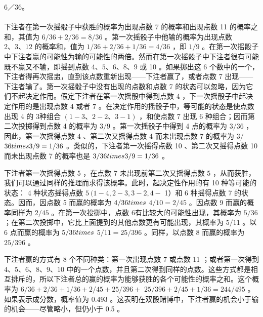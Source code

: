 6／36。\\\\下注者在第一次摇骰子中获胜的概率为出现点数 7 的概率和出现点数 11 的概率之和，其值为 $6 / 36+2 / 36=8 / 36$ 。第一次摇骰子中他输的概率为出现点数 $2 、 3 、 12$ 的概率和，值为 $1 / 36+2 / 36+1 / 36=4 / 36$ ，即 $1 / 9$ 。在第一次摇骰子中下注者赢的可能性为输的可能性的两倍。然而在第一次摇骰子中下注者很有可能既不赢又不输，即摇到点数 $4 、 5 、 6 、 8 、 9$ 或 10 。如果掷出这 6 个数中的一个，下注者得再次摇盅，直到该点数重新出现——下注者赢了，或者点数 7 出现——下注者输了。第一次摇骰子中没有出现的点数和点数 7 的状态可以忽略，因为它们不起决定作用。假定下注者在第一次摇骰中得到点数 4 ，下一次摇骰子中起决定作用的是出现点数 4 或者 7 。在决定作用的摇骰子中，等可能的状态是使点数出现 4 的 3种组合 $(1-3 、 2-2 、 3-1)$ ，和使点数 7 出现 6 种组合；因而第二次投掷得到点数 4 的概率为 $3 / 9$ 。第一次摇骰子中得到 4 点的概率为 $3 / 36$ ，因此，第一次摇得点数 4 、第二次又摇得点数 4 而未出现点数 7 的概率为 $3 /$ $36 \\times 3 / 9=1 / 36$ 。类似的，下注者第一次摇得点数 10 、第二次又摇得点数 10 而未出现点数 7 的概率也是 $3 / 36 \\times 3 / 9=1 / 36$ 。

下注者第一次摇得点数 5 ，在点数 7 未出现前第二次又摇得点数 5 ，从而获胜，我们可以通过同样的推理而求得该概率。此时，起决定性作用的有 10 种等可能的状态： 4 种状态摇得点数 $5 ~(1-4,2-3,3-2,4-$ 1）和 6 种摇得点数 7 的状态。因而，因点数 5 而赢的概率为 $4 / 36 \\times$ $4 / 10=2 / 45$ 。因点数 9 而赢的概率同样为 $2 / 45$ 。在第一次投掷中，点数 6有比较大的可能性出现，其概率为 $5 / 36$ ；在第二次投掷中，它比上面提到的其他点数更有可能出现，其概率为 $5 / 11$ 。以 6 点而赢的概率为 $5 / 36 \\times$ $5 / 11=25 / 396$ 。同样，以点数 8 而赢的概率为 $25 / 396$ 。

下注者赢的方式有 8 个不同种类：第一次出现点数 7 或点数 11 ；或者第一次得到 $4 、 5 、 6 、 8 、 9 、 10$ 中的一个点数，并且第二次得到同样的点数。这些方式都是相互排斥的，所以下注者总的赢的概率为能够获胜的各个可能性的概率之和。这个概率为 $6 / 36+2 / 36+1 / 36+2 / 45+25 / 396+$ $25 / 396+2 / 45+1 / 36=244 / 495$ 。如果表示成分数，概率值为 0.493 。这表明在双骰赌博中，下注者赢的机会小于输的机会——尽管略小，但仍小于 0.5 。

